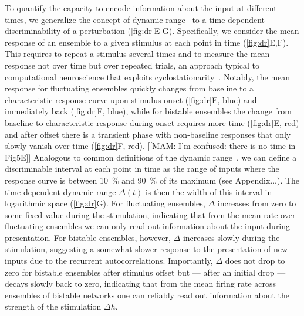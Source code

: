 To quantify the capacity to encode information about the input at different times, we generalize the concept of dynamic range~\cite{kinouchi_optimal_2006, zierenberg_tailored_2020} to a time-dependent discriminability of a perturbation (\cref{fig:dr}E-G).
Specifically, we consider the mean response of an ensemble to a given stimulus at each point in time (\cref{fig:dr}E,F).
This requires to repeat a stimulus several times and to measure the mean response not over time but over repeated trials, an approach typical to computational neuroscience that exploits cyclostationarity~\cite{de_heuvel_characterizing_2020}.
Notably, the mean response for fluctuating ensembles quickly changes from baseline to a characteristic response curve upon stimulus onset (\cref{fig:dr}E, blue) and immediately back (\cref{fig:dr}F, blue), while for bistable ensembles the change from baseline to characteristic response during onset requires more time (\cref{fig:dr}E, red) and after offset there is a transient phase with non-baseline responses that only slowly vanish over time (\cref{fig:dr}F, red).
[[MAM: I'm confused: there is no time in Fig5E]]
Analogous to common definitions of the dynamic range~\cite{kinouchi_optimal_2006}, we can define a discriminable interval at each point in time as the range of inputs where the response curve is between \SI{10}{\percent} and \SI{90}{\percent} of its maximum (see Appendix...).
The time-dependent dynamic range $\Delta(t)$ is then the width of this interval in logarithmic space (\cref{fig:dr}G).
For fluctuating ensembles, $\Delta$ increases from zero to some fixed value during the stimulation, indicating that from the mean rate over fluctuating ensembles we can only read out information about the input during presentation.
For bistable ensembles, however, $\Delta$ increases slowly during the stimulation, suggesting a somewhat slower response to the presentation of new inputs due to the recurrent autocorrelations.
Importantly, $\Delta$ does not drop to zero for bistable ensembles after stimulus offset but --- after an initial drop --- decays slowly back to zero, indicating that from the mean firing rate across ensembles of bistable networks one can reliably read out information about the strength of the stimulation $\Delta h$.
